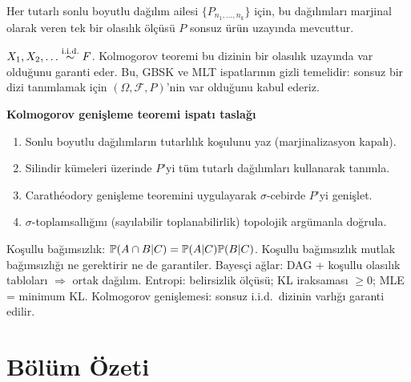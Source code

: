\begin{teorem}\label{thm:kolmogorov_genisleme}
Her tutarlı sonlu boyutlu dağılım ailesi $\{P_{n_1,\ldots,n_k}\}$ için, bu dağılımları marjinal olarak veren tek bir olasılık ölçüsü $P$ sonsuz ürün uzayında mevcuttur.
\end{teorem}

\begin{ornek}\label{ex:iid_uzay}
$X_1,X_2,\ldots\overset{\text{i.i.d.}}{\sim} F$. Kolmogorov teoremi bu dizinin bir olasılık uzayında var olduğunu garanti eder. Bu, GBSK ve MLT ispatlarının gizli temelidir: sonsuz bir dizi tanımlamak için $(\Omega,\mathcal{F},P)$'nin var olduğunu kabul ederiz.
\end{ornek}

\begin{ispatiskele}
\textbf{Kolmogorov genişleme teoremi ispatı taslağı}
\begin{enumerate}
  \item Sonlu boyutlu dağılımların tutarlılık koşulunu yaz (marjinalizasyon kapalı).
  \item Silindir kümeleri üzerinde $P$'yi tüm tutarlı dağılımları kullanarak tanımla.
  \item Carathéodory genişleme teoremini uygulayarak $\sigma$-cebirde $P$'yi genişlet.
  \item $\sigma$-toplamsallığını (sayılabilir toplanabilirlik) topolojik argümanla doğrula.
\end{enumerate}
\end{ispatiskele}

\begin{mikroozet}
Koşullu bağımsızlık: $\mathbb{P}(A\cap B|C) = \mathbb{P}(A|C)\mathbb{P}(B|C)$.
Koşullu bağımsızlık mutlak bağımsızlığı ne gerektirir ne de garantiler.
Bayesçi ağlar: DAG + koşullu olasılık tabloları $\Rightarrow$ ortak dağılım.
Entropi: belirsizlik ölçüsü; KL iraksaması $\geq0$; MLE = minimum KL.
Kolmogorov genişlemesi: sonsuz i.i.d.\ dizinin varlığı garanti edilir.
\end{mikroozet}

\section*{Bölüm Özeti}

